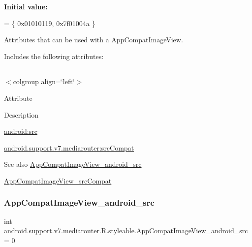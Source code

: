 {\bfseries Initial value\+:}
\begin{DoxyCode}
= \{
            0x01010119, 0x7f01004a
        \}
\end{DoxyCode}
Attributes that can be used with a App\+Compat\+Image\+View. 

Includes the following attributes\+:

\tabulinesep=1mm
\begin{longtabu} spread 0pt [c]{*{0}{|X[-1]}|}
\hline
\end{longtabu}
$<$colgroup align=\char`\"{}left\char`\"{}$>$ 

Attribute

Description 

{\ttfamily \hyperlink{classandroid_1_1support_1_1v7_1_1mediarouter_1_1R_1_1styleable_a989859c4889fdb7b7569276cbfdd438e}{android\+:src}}

{\ttfamily \hyperlink{classandroid_1_1support_1_1v7_1_1mediarouter_1_1R_1_1styleable_a71ebb568ec6b94514a7c9cdcace4bbbd}{android.\+support.\+v7.\+mediarouter\+:src\+Compat}}

\begin{DoxySeeAlso}{See also}
\hyperlink{classandroid_1_1support_1_1v7_1_1mediarouter_1_1R_1_1styleable_a989859c4889fdb7b7569276cbfdd438e}{App\+Compat\+Image\+View\+\_\+android\+\_\+src} 

\hyperlink{classandroid_1_1support_1_1v7_1_1mediarouter_1_1R_1_1styleable_a71ebb568ec6b94514a7c9cdcace4bbbd}{App\+Compat\+Image\+View\+\_\+src\+Compat} 
\end{DoxySeeAlso}
\mbox{\label{classandroid_1_1support_1_1v7_1_1mediarouter_1_1R_1_1styleable_a989859c4889fdb7b7569276cbfdd438e}} 
\subsubsection{\texorpdfstring{App\+Compat\+Image\+View\+\_\+android\+\_\+src}{AppCompatImageView\_android\_src}}
{\footnotesize\ttfamily int android.\+support.\+v7.\+mediarouter.\+R.\+styleable.\+App\+Compat\+Image\+View\+\_\+android\+\_\+src = 0\hspace{0.3cm}{\ttfamily [static]}}

